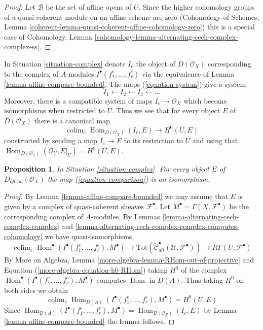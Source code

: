 \documentclass{stacks-project}
\theoremstyle{plain}
\newtheorem{proposition}[subsection]{Proposition}
\theoremstyle{definition}
\theoremstyle{remark}
\numberwithin{equation}{subsection}
\def\colim{\mathop{\mathrm{colim}}\nolimits}
\def\Hom{\mathop{\mathrm{Hom}}\nolimits}
\def\QCoh{\mathit{QCoh}}
\begin{document}
\begin{proof}
Let $\mathcal{B}$ be the set of affine opens of $U$. Since the higher
cohomology groups of a quasi-coherent module on an affine scheme are zero
(Cohomology of Schemes, Lemma
\ref{coherent-lemma-quasi-coherent-affine-cohomology-zero})
this is a special case of
Cohomology, Lemma \ref{cohomology-lemma-alternating-cech-complex-complex-ss}.
\end{proof}

\noindent
In Situation \ref{situation-complex} denote $I_e$ the object of
$D(\mathcal{O}_X)$ corresponding to the complex of $A$-modules
$I^\bullet(f_1^e, \ldots, f_r^e)$ via the equivalence of
Lemma \ref{lemma-affine-compare-bounded}. The maps
(\ref{equation-system}) give a system
$$
I_1 \leftarrow
I_2 \leftarrow
I_3 \leftarrow \ldots
$$
Moreover, there is a compatible system of maps $I_e \to \mathcal{O}_X$
which become isomorphisms when restricted to $U$. Thus we see that for
every object $E$ of $D(\mathcal{O}_X)$ there is a canonical map
\begin{equation}
\label{equation-comparison}
\colim_e \Hom_{D(\mathcal{O}_X)}(I_e, E) \longrightarrow H^0(U, E)
\end{equation}
constructed by sending a map $I_e \to E$ to its restriction to $U$
and using that
$\Hom_{D(\mathcal{O}_U)}(\mathcal{O}_U, E|_U) = H^0(U, E)$.

\begin{proposition}
\label{proposition-represent-cohomology-class-on-open}
In Situation \ref{situation-complex}. For every object $E$
of $D_\QCoh(\mathcal{O}_X)$ the map
(\ref{equation-comparison}) is an isomorphism.
\end{proposition}

\begin{proof}
By Lemma \ref{lemma-affine-compare-bounded} we may assume that $E$
is given by a complex of quasi-coherent sheaves $\mathcal{F}^\bullet$.
Let $M^\bullet = \Gamma(X, \mathcal{F}^\bullet)$ be the corresponding
complex of $A$-modules. By
Lemmas \ref{lemma-alternating-cech-complex-complex} and
\ref{lemma-alternating-cech-complex-complex-computes-cohomology}
we have quasi-isomorphisms
$$
\colim_e \Hom^\bullet(I^\bullet(f_1^e, \ldots, f_r^e), M^\bullet)
\longrightarrow
\text{Tot}(\check{\mathcal{C}}_{alt}^\bullet(\mathcal{U}, \mathcal{F}^\bullet))
\longrightarrow
R\Gamma(U, \mathcal{F}^\bullet)
$$
By More on Algebra, Lemma \ref{more-algebra-lemma-RHom-out-of-projective} and
Equation (\ref{more-algebra-equation-h0-RHom})
taking $H^0$ of the complex
$\Hom^\bullet(I^\bullet(f_1^e, \ldots, f_r^e), M^\bullet)$
computes $\Hom$ in $D(A)$. Thus taking $H^0$ on both sides we obtain
$$
\colim_e \Hom_{D(A)}(I^\bullet(f_1^e, \ldots, f_r^e), M^\bullet)
=
H^0(U, E)
$$
Since $\Hom_{D(A)}(I^\bullet(f_1^e, \ldots, f_r^e), M^\bullet) =
\Hom_{D(\mathcal{O}_X)}(I_e, E)$ by
Lemma \ref{lemma-affine-compare-bounded} the lemma follows.
\end{proof}
\end{document}
